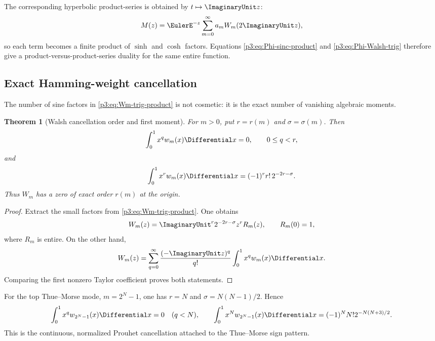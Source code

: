 \documentclass[11pt]{article}
\newtheorem{theorem}{Theorem}[section]
\theoremstyle{definition}
\theoremstyle{remark}
\begin{document}
The corresponding hyperbolic product-series is obtained by $t\mapsto\ImaginaryUnit z$:
\begin{equation}\label{p3:eq:M-Walsh}
 M(z)=\EulerE^{-z}\sum_{m=0}^\infty a_mW_m(2\ImaginaryUnit z),
\end{equation}
so each term becomes a finite product of $\sinh$ and $\cosh$ factors.
Equations \eqref{p3:eq:Phi-sinc-product} and \eqref{p3:eq:Phi-Walsh-trig} therefore
give a product-versus-product-series duality for the same entire function.

\subsection{Exact Hamming-weight cancellation}

The number of sine factors in \eqref{p3:eq:Wm-trig-product} is not cosmetic: it is
the exact number of vanishing algebraic moments.

\begin{theorem}[Walsh cancellation order and first moment]
\label{p3:thm:Walsh-moment-cancellation}
For $m>0$, put $r=r(m)$ and $\sigma=\sigma(m)$.  Then
\begin{equation}\label{p3:eq:Walsh-vanishing-moments}
 \int_0^1x^qw_m(x)\Differential x=0,
 \qquad 0\le q<r,
\end{equation}
and
\begin{equation}\label{p3:eq:Walsh-first-moment}
 \int_0^1x^rw_m(x)\Differential x
 =(-1)^rr!\,2^{-2r-\sigma}.
\end{equation}
Thus $W_m$ has a zero of exact order $r(m)$ at the origin.
\end{theorem}

\begin{proof}
Extract the small factors from \eqref{p3:eq:Wm-trig-product}.  One obtains
\begin{equation}\label{p3:eq:Wm-factorized-origin}
 W_m(z)=\ImaginaryUnit^r2^{-2r-\sigma}z^rR_m(z),
 \qquad R_m(0)=1,
\end{equation}
where $R_m$ is entire.  On the other hand,
\begin{equation}\label{p3:eq:Wm-moment-Taylor}
 W_m(z)=\sum_{q=0}^\infty\frac{(-\ImaginaryUnit z)^q}{q!}
 \int_0^1x^qw_m(x)\Differential x.
\end{equation}
Comparing the first nonzero Taylor coefficient proves both statements.
\end{proof}

For the top Thue--Morse mode, $m=2^N-1$, one has $r=N$ and
$\sigma=N(N-1)/2$.  Hence
\begin{equation}\label{p3:eq:Thue-Morse-moment}
 \int_0^1x^qw_{2^N-1}(x)\Differential x=0\quad(q<N),
 \qquad
 \int_0^1x^Nw_{2^N-1}(x)\Differential x
 =(-1)^NN!2^{-N(N+3)/2}.
\end{equation}
This is the continuous, normalized Prouhet cancellation attached to the
Thue--Morse sign pattern.
\end{document}

